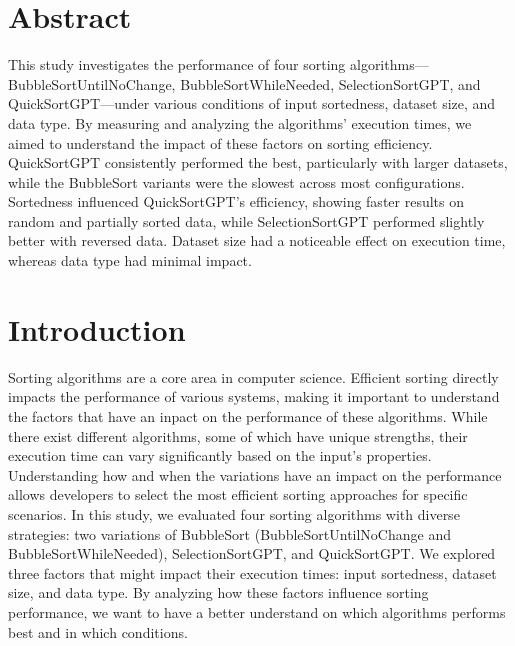 \documentclass[unicode,11pt,a4paper,oneside,numbers=endperiod,openany]{scrartcl}
\begin{document}
\setassignment
{}

\newline


\section{Abstract}

This study investigates the performance of four sorting algorithms—BubbleSortUntilNoChange, BubbleSortWhileNeeded, SelectionSortGPT, and QuickSortGPT—under various conditions of input sortedness, dataset size, and data type. By measuring and analyzing the algorithms' execution times, we aimed to understand the impact of these factors on sorting efficiency. QuickSortGPT consistently performed the best, particularly with larger datasets, while the BubbleSort variants were the slowest across most configurations. Sortedness influenced QuickSortGPT's efficiency, showing faster results on random and partially sorted data, while SelectionSortGPT performed slightly better with reversed data. Dataset size had a noticeable effect on execution time, whereas data type had minimal impact.


\section{Introduction}

Sorting algorithms are a core area in computer science. Efficient sorting directly impacts the performance of various systems, making it important to understand the factors that have an inpact on the performance of these algorithms. 
While there exist different algorithms, some of which have unique strengths, their execution time can vary significantly based on the input's properties. Understanding how and when the variations have an impact on the performance allows developers to select the most efficient sorting approaches for specific scenarios.
In this study, we evaluated four sorting algorithms with diverse strategies: two variations of BubbleSort (BubbleSortUntilNoChange and BubbleSortWhileNeeded), SelectionSortGPT, and QuickSortGPT. We explored three factors that might impact their execution times: input sortedness, dataset size, and data type. By analyzing how these factors influence sorting performance, we want to have a better understand on which algorithms performs best and in which conditions.
\end{document}
